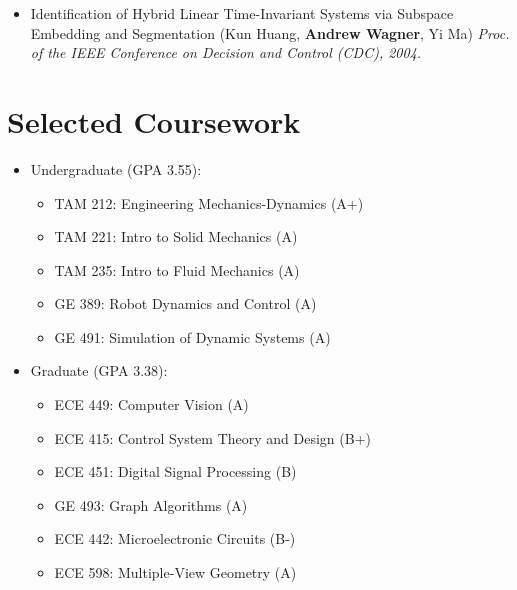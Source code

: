 \documentclass[line]{res}
\def\spaceline{\vspace{1mm} \fullline}
\begin{document}
\begin{resume}
\begin{itemize}
\item Identification of Hybrid Linear Time-Invariant Systems via Subspace Embedding and Segmentation (Kun Huang, {\bf Andrew Wagner}, Yi Ma) {\it Proc. of the IEEE Conference on Decision and Control (CDC), 2004.}
\end{itemize}
	\section{Selected Coursework}

	\begin{itemize} 
\item 
	\spaceline
Undergraduate (GPA 3.55):
	\begin{itemize}
	\item TAM 212: Engineering Mechanics-Dynamics (A+)
	\item TAM 221: Intro to Solid Mechanics (A)
	\item TAM 235: Intro to Fluid Mechanics (A)
	\item GE 389: Robot Dynamics and Control (A)
	\item GE 491: Simulation of Dynamic Systems (A)
\end{itemize}
	\item Graduate (GPA 3.38):
\begin{itemize}
\item ECE 449: Computer Vision (A)	
\item ECE 415: Control System Theory and Design (B+)

\item ECE 451: Digital Signal Processing (B)
\item GE 493: Graph Algorithms (A)


\item ECE 442: Microelectronic Circuits (B-)
\item ECE 598: Multiple-View Geometry (A)


\end{itemize}
\end{itemize}
\end{resume}
\end{document}
